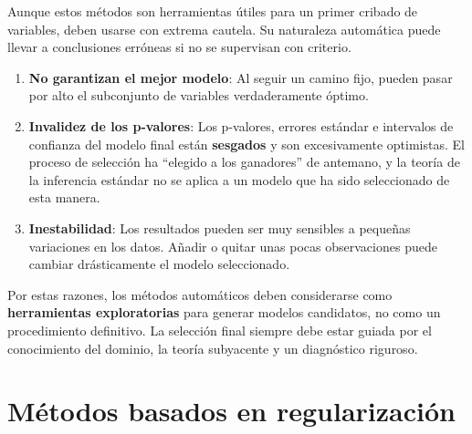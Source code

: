 \documentclass[
  letterpaper,
  DIV=11,
  numbers=noendperiod]{scrreprt}
\providecommand{\tightlist}{%
  \setlength{\itemsep}{0pt}\setlength{\parskip}{0pt}}
\begin{document}
\begin{tcolorbox}[enhanced jigsaw, breakable, toprule=.15mm, bottomtitle=1mm, coltitle=black, colbacktitle=quarto-callout-warning-color!10!white, titlerule=0mm, opacitybacktitle=0.6, bottomrule=.15mm, toptitle=1mm, title=\textcolor{quarto-callout-warning-color}{\faExclamationTriangle}\hspace{0.5em}{Advertencia sobre los métodos automáticos}, arc=.35mm, rightrule=.15mm, opacityback=0, colframe=quarto-callout-warning-color-frame, leftrule=.75mm, left=2mm, colback=white]

Aunque estos métodos son herramientas útiles para un primer cribado de
variables, deben usarse con extrema cautela. Su naturaleza automática
puede llevar a conclusiones erróneas si no se supervisan con criterio.

\begin{enumerate}
\def\labelenumi{\arabic{enumi}.}
\tightlist
\item
  \textbf{No garantizan el mejor modelo}: Al seguir un camino fijo,
  pueden pasar por alto el subconjunto de variables verdaderamente
  óptimo.
\item
  \textbf{Invalidez de los p-valores}: Los p-valores, errores estándar e
  intervalos de confianza del modelo final están \textbf{sesgados} y son
  excesivamente optimistas. El proceso de selección ha ``elegido a los
  ganadores'' de antemano, y la teoría de la inferencia estándar no se
  aplica a un modelo que ha sido seleccionado de esta manera.
\item
  \textbf{Inestabilidad}: Los resultados pueden ser muy sensibles a
  pequeñas variaciones en los datos. Añadir o quitar unas pocas
  observaciones puede cambiar drásticamente el modelo seleccionado.
\end{enumerate}

Por estas razones, los métodos automáticos deben considerarse como
\textbf{herramientas exploratorias} para generar modelos candidatos, no
como un procedimiento definitivo. La selección final siempre debe estar
guiada por el conocimiento del dominio, la teoría subyacente y un
diagnóstico riguroso.

\end{tcolorbox}

\section{Métodos basados en
regularización}\label{muxe9todos-basados-en-regularizaciuxf3n}
\end{document}
